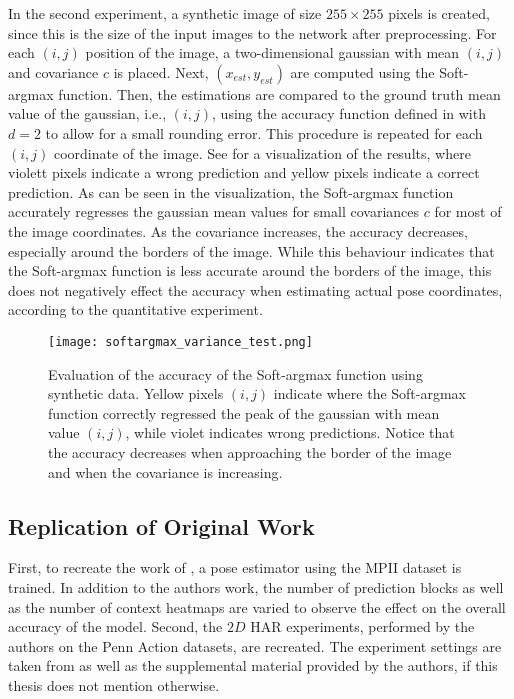 In the second experiment, a synthetic image of size $255 \times 255$ pixels is created, since this is the size of the input images to the network after preprocessing.
For each $(i,j)$ position of the image, a two-dimensional gaussian with mean $(i,j)$ and covariance $c$ is placed.
Next, $(x_{est},y_{est})$ are computed using the Soft-argmax function.
Then, the estimations are compared to the ground truth mean value of the gaussian, i.e., $(i,j)$, using the accuracy function defined in  with $d=2$ to allow for a small rounding error.
This procedure is repeated for each $(i,j)$ coordinate of the image.
See  for a visualization of the results, where violett pixels indicate a wrong prediction and yellow pixels indicate a correct prediction.
As can be seen in the visualization, the Soft-argmax function accurately regresses the gaussian mean values for small covariances $c$ for most of the image coordinates.
As the covariance increases, the accuracy decreases, especially around the borders of the image.
While this behaviour indicates that the Soft-argmax function is less accurate around the borders of the image, this does not negatively effect the accuracy when estimating actual pose coordinates, according to the quantitative experiment.

\begin{figure}[htb!]
    \centering
    \texttt{[image: softargmax\_variance\_test.png]}
    \caption{Evaluation of the accuracy of the Soft-argmax function using synthetic data. Yellow pixels $(i,j)$ indicate where the Soft-argmax function correctly regressed the peak of the gaussian with mean value $(i,j)$, while violet indicates wrong predictions. Notice that the accuracy decreases when approaching the border of the image and when the covariance is increasing. }
    \label{fig:softargmax_variance_test}
\end{figure}

\subsection{Replication of Original Work}
\label{sec:exp-replication}

First, to recreate the work of \cite{luvizon_2d/3d_2018}, a pose estimator using the MPII dataset is trained.
In addition to the authors work, the number of prediction blocks as well as the number of context heatmaps are varied to observe the effect on the overall accuracy of the model.
Second, the $2D$ HAR experiments, performed by the authors on the Penn Action datasets, are recreated.
The experiment settings are taken from \cite{luvizon_2d/3d_2018} as well as the supplemental material provided by the authors, if this thesis does not mention otherwise.

